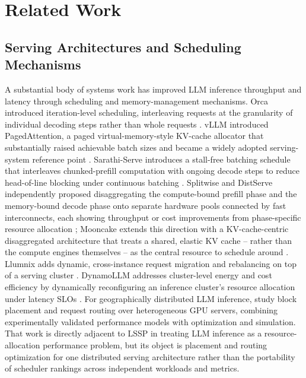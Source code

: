 \section{Related Work}
\label{sec:related-work}

\subsection{Serving Architectures and Scheduling Mechanisms}
\label{sec:related-serving}

A substantial body of systems work has improved LLM inference throughput and
latency through scheduling and memory-management mechanisms. Orca introduced
iteration-level scheduling, interleaving requests at the granularity of
individual decoding steps rather than whole requests
\citep{yu2022orca}. vLLM introduced PagedAttention, a paged
virtual-memory-style KV-cache allocator that substantially raised achievable
batch sizes and became a widely adopted serving-system reference point
\citep{kwon2023vllm}. Sarathi-Serve introduces a stall-free batching
schedule that interleaves chunked-prefill computation with ongoing decode
steps to reduce head-of-line blocking under continuous batching
\citep{agrawal2024sarathi}.
Splitwise and DistServe independently proposed disaggregating the
compute-bound prefill phase and the memory-bound decode phase onto separate
hardware pools connected by fast interconnects, each showing throughput or
cost improvements from phase-specific resource allocation
\citep{patel2024splitwise,zhong2024distserve}; Mooncake extends this
direction with a KV-cache-centric disaggregated architecture that treats a
shared, elastic KV cache -- rather than the compute engines themselves -- as
the central resource to schedule around \citep{qin2025mooncake}. Llumnix
adds dynamic, cross-instance request migration and rebalancing on top of a
serving cluster \citep{sun2024llumnix}. DynamoLLM addresses cluster-level
energy and cost efficiency by dynamically reconfiguring an inference
cluster's resource allocation under latency SLOs \citep{stojkovic2025dynamollm}.
For geographically distributed LLM inference, \citet{sun2025geodistributed}
study block placement and request routing over heterogeneous GPU servers,
combining experimentally validated performance models with optimization
and simulation. That work is directly adjacent to LSSP in treating LLM
inference as a resource-allocation performance problem, but its object is
placement and routing optimization for one distributed serving
architecture rather than the portability of scheduler rankings across
independent workloads and metrics.

